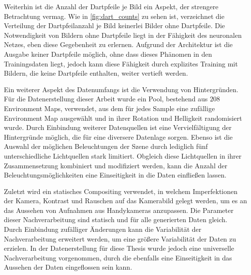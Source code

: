
Weiterhin ist die Anzahl der Dartpfeile je Bild ein Aspekt, der strengere Betrachtung vermag. Wie in \autoref{fig:dart_counts} zu sehen ist, verzeichnet die Verteilung der Dartpfeilanzahl je Bild keinerlei Bilder ohne Dartpfeile. Die Notwendigkeit von Bildern ohne Dartpfeile liegt in der Fähigkeit des neuronalen Netzes, eben diese Gegebenheit zu erlernen. Aufgrund der Architektur ist die Ausgabe keiner Dartpfeile möglich, ohne dass dieses Phänomen in den Trainingsdaten liegt, jedoch kann diese Fähigkeit durch explizites Training mit Bildern, die keine Dartpfeile enthalten, weiter vertieft werden.


Ein weiterer Aspekt des Datenumfangs ist die Verwendung von Hintergründen. Für die Datenerstellung dieser Arbeit wurde ein Pool, bestehend aus $208$ Environment Maps, verwendet, aus dem für jedes Sample eine zufällige Environment Map ausgewählt und in ihrer Rotation und Helligkeit randomisiert wurde. Durch Einbindung weiterer Datenquellen ist eine Vervielfältigung der Hintergründe möglich, die für eine diversere Datenlage sorgen. Ebenso ist die Auswahl der möglichen Beleuchtungen der Szene durch lediglich fünf unterschiedliche Lichtquellen stark limitiert. Obgleich diese Lichtquellen in ihrer Zusammensetzung kombiniert und modifiziert werden, kann die Anzahl der Beleuchtungsmöglichkeiten eine Einseitigkeit in die Daten einfließen lassen.


Zuletzt wird ein statisches Compositing verwendet, in welchem Imperfektionen der Kamera, Kontrast und Rauschen auf das Kamerabild gelegt werden, um es an das Aussehen von Aufnahmen aus Handykameras anzupassen. Die Parameter dieser Nachverarbeitung sind statisch und für alle generierten Daten gleich. Durch Einbindung zufälliger Änderungen kann die Variabilität der Nachverarbeitung erweitert werden, um eine größere Variabilität der Daten zu erzielen. In der Datenerstellung für diese Thesis wurde jedoch eine universelle Nachverarbeitung vorgenommen, durch die ebenfalls eine Einseitigkeit in das Aussehen der Daten eingeflossen sein kann.

